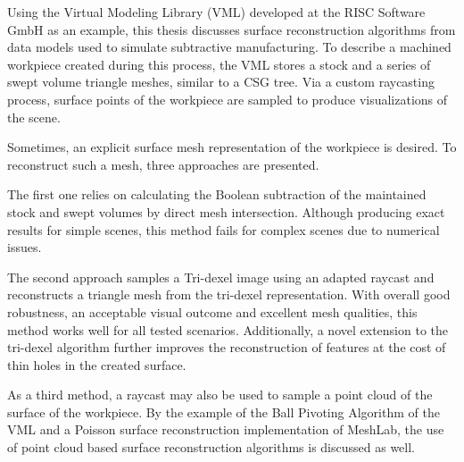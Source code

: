 Using the Virtual Modeling Library (VML) developed at the RISC Software GmbH as an example, this thesis discusses surface reconstruction algorithms from data models used to simulate subtractive manufacturing.
To describe a machined workpiece created during this process, the VML stores a stock and a series of swept volume triangle meshes, similar to a CSG tree.
Via a custom raycasting process, surface points of the workpiece are sampled to produce visualizations of the scene.

Sometimes, an explicit surface mesh representation of the workpiece is desired.
To reconstruct such a mesh, three approaches are presented.

The first one relies on calculating the Boolean subtraction of the maintained stock and swept volumes by direct mesh intersection.
Although producing exact results for simple scenes, this method fails for complex scenes due to numerical issues.

The second approach samples a Tri-dexel image using an adapted raycast and reconstructs a triangle mesh from the tri-dexel representation.
With overall good robustness, an acceptable visual outcome and excellent mesh qualities, this method works well for all tested scenarios.
Additionally, a novel extension to the tri-dexel algorithm further improves the reconstruction of features at the cost of thin holes in the created surface.

As a third method, a raycast may also be used to sample a point cloud of the surface of the workpiece.
By the example of the Ball Pivoting Algorithm of the VML and a Poisson surface reconstruction implementation of MeshLab, the use of point cloud based surface reconstruction algorithms is discussed as well.
